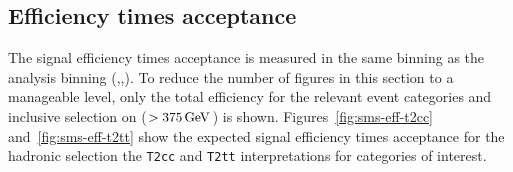 \subsection{Efficiency times acceptance\label{sec:t2cc-eff}}

The signal efficiency times acceptance is measured in the same binning
as the analysis binning (\njet,\nb,\scalht). To reduce the number of
figures in this section to a manageable level, only the total efficiency for
the relevant event categories and inclusive selection on \scalht ($>375\,\text{Ge\hspace{-.08em}V}$) 
is shown. Figures~\ref{fig:sms-eff-t2cc} and~\ref{fig:sms-eff-t2tt} show the
expected signal efficiency times acceptance for the hadronic selection
the \verb!T2cc! and \verb!T2tt! interpretations for categories of interest.

\begin{figure}[h!]
  \begin{center}
\end{center}
\end{figure}
